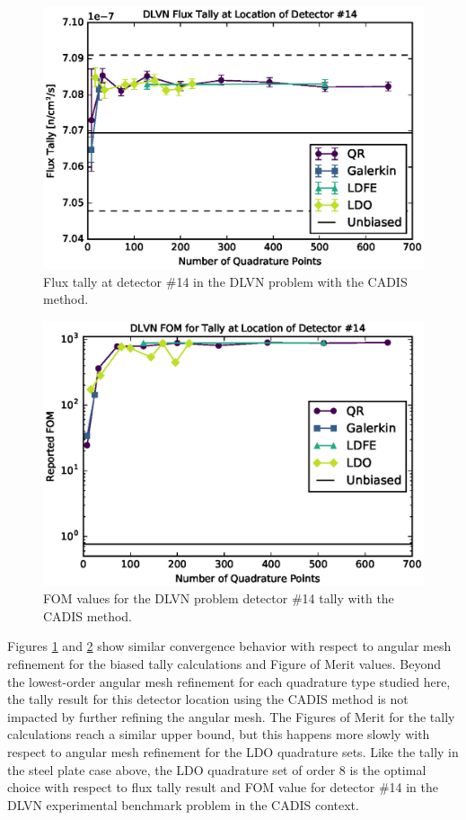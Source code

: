 \begin{figure}[!htb]
\centering
\includegraphics[max height=0.445\textheight]{img/dlvn-plots/mcnp/cadis-tally-14.eps}
\caption{Flux tally at detector \#14 in the DLVN problem with the CADIS method.}
\label{dlvn-cad-tally}
\end{figure}

\begin{figure}[!htb]
\centering
\includegraphics[max height=0.445\textheight]{img/dlvn-plots/mcnp/cadis-fom-14.eps}
\caption{FOM values for the DLVN problem detector \#14 tally with the CADIS 
         method.}
\label{dlvn-cad-fom}
\end{figure}

Figures \ref{dlvn-cad-tally} and \ref{dlvn-cad-fom} show similar convergence behavior 
with respect to angular mesh refinement for the biased tally calculations and Figure 
of Merit values. Beyond the lowest-order angular mesh refinement for each
quadrature type studied here, the tally result for this detector location using the
CADIS method is not impacted by further refining the angular mesh. The Figures of
Merit for the tally calculations reach a similar upper bound, but this happens more
slowly with respect to angular mesh refinement for the LDO quadrature sets. Like the
tally in the steel plate case above, the LDO quadrature set of order 8 is the optimal
choice with respect to flux tally result and FOM value for detector \#14 in the DLVN
experimental benchmark problem in the CADIS context.


